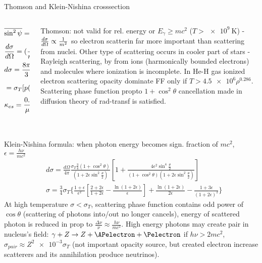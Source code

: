 \begin{frame}{Thomson and Klein-Nishina crosssection}
    \begin{columns}[T]
        \begin{column}{0.6\textwidth}
            \begin{align*}
                &\overline{\sin^2{\psi}}=1-\sin^2{\theta}\overline{cos^2{\phi}}=1-\frac{1}{2}\sin^2{\theta}\tag{unpol.}\\
                &\TDy{\Omega}{\sigma}=(\frac{e^2}{mc^2})^2 \frac{1}{2}(1+\cos^2{\theta})\tag{Thomson}\\
                &d\sigma=\frac{8\pi}{3}(\frac{e^2}{mc^2})^2p(\cos{\theta})\frac{d\Omega}{4\pi}\tag{Norm. scat. phase function}\\
                &=\sigma_T[p(\cos{\theta})\frac{d\Omega}{4\pi}],\sigma_T=\frac{8\pi}{3}(\frac{e^2}{mc^2})^2=\SI{0.665e-24}{\square\cm}\\
                &\kappa_{es}=\frac{0.4}{\mu_e}\approx0.2(1+X_H)\tag{complete ioniz.}\\
                &
            \end{align*}
        \end{column}
        \begin{column}{0.4\textwidth}
            Thomson: not valid for rel. energy or $E_{\gamma}\geq mc^2$ ($T>\SI{e9}{\kelvin}$) - $\frac{d \sigma}{d \Omega}\propto \frac{1}{m^2}$ so electron scatterin far more important than scattering from nuclei.
            Other type of scattering occurs in cooler part of stars - Rayleigh scattering, by from ions (harmonically bounded electrons) and molecules where ionization is incomplete. In He-H gas ionized electron scattering opacity dominate FF only if $T>\num{4.5e6}\rho^{0.286}$. Scattering phase function propto $1+\cos^2{\theta}$ cancellation made in diffusion theory of rad-transf is satisfied.
        \end{column}
    \end{columns}
    Klein-Nishina formula: when photon energy becomes sign. fraction of $mc^2$, $\epsilon=\frac{h\nu}{mc^2}$
    \begin{align*}
        &d\sigma=\frac{d\Omega}{4\pi}\frac{\sigma_T \frac{3}{4}(1+\cos^2{\theta})}{(1+2\epsilon\sin^2{\frac{\theta}{2}})}[1+\frac{4\epsilon^2\sin^4{\frac{\theta}{2}}}{(1+\cos^2{\theta})(1+2\epsilon\sin^2{\frac{\theta}{2}})}]\\
        &\sigma=\frac{3}{4}\sigma_T\{\frac{1+\epsilon}{\epsilon^2}[\frac{2+2\epsilon}{1+2\epsilon}-\frac{\ln{(1+2\epsilon)}}{\epsilon}]+\frac{\ln{(1+2\epsilon)}}{2\epsilon}-\frac{1+3\epsilon}{(1+2\epsilon)^2}\}
    \end{align*}
    At high temperature $\sigma<\sigma_T$, scattering phase function contains odd power of $\cos{\theta}$ (scattering of photons into/out no longer cancels), energy of scattered photon is reduced in prop to $\frac{\Delta\nu}{\nu}\approx \frac{h\nu}{mc^2}$.
    High energy photons may create \Pelectron\APelectron pair in nucleus's field: $\gamma+Z\to Z+\APelectron+\Pelectron$ if $h\nu>2mc^2$, $\sigma_{pair}\approx Z^2\num{e-3}\sigma_T$ (not important opacity source, but created electron increase scatterers and its annihilation produce neutrinos).
\end{frame}

